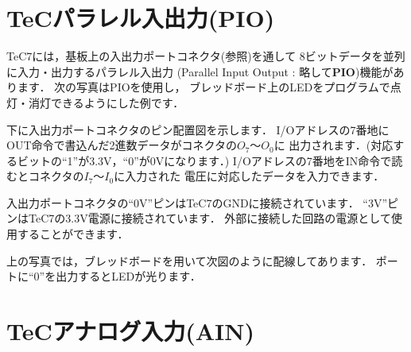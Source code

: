 \newpage
\section{TeCパラレル入出力(PIO)}
\label{pio}

TeC7には，基板上の入出力ポートコネクタ(参照)を通して
8ビットデータを並列に入力・出力するパラレル入出力
(Parallel Input Output : 略して{\bf PIO})機能があります．
次の写真はPIOを使用し，
ブレッドボード上のLEDをプログラムで点灯・消灯できるようにした例です．

\begin{center}
\epsfxsize=6.5cm
\end{center}

下に入出力ポートコネクタのピン配置図を示します．
I/Oアドレスの7番地にOUT命令で書込んだ2進数データがコネクタの$O_7$〜$O_0$に
出力されます．(対応するビットの``1''が3.3V，``0''が0Vになります．)
I/Oアドレスの7番地をIN命令で読むとコネクタの$I_7$〜$I_0$に入力された
電圧に対応したデータを入力できます．

入出力ポートコネクタの``0V''ピンはTeC7のGNDに接続されています．
``3V''ピンはTeC7の3.3V電源に接続されています．
外部に接続した回路の電源として使用することができます．

\begin{center}
\epsfxsize=5.5cm
\end{center}

上の写真では，ブレッドボードを用いて次図のように配線してあります．
ポートに``0''を出力するとLEDが光ります．

\begin{center}
\epsfxsize=4cm
\end{center}

\newpage
\section{TeCアナログ入力(AIN)}
\label{ain}

